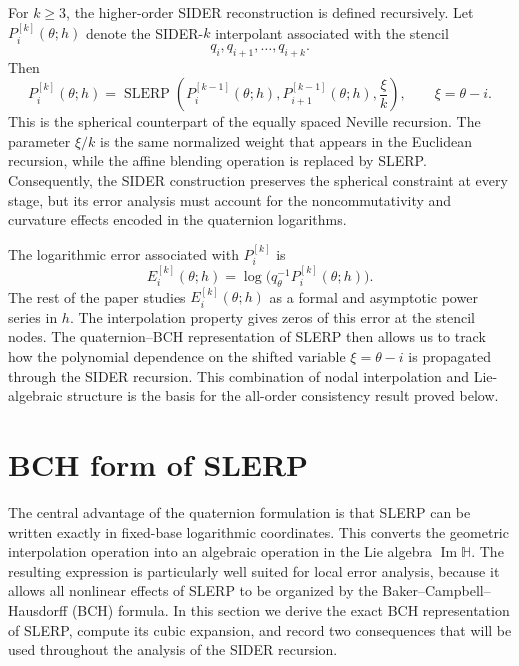 \documentclass[a4paper,11pt]{article}
\newcommand{\bH}{\mathbb{H}}
\newcommand{\SLERP}{\operatorname{SLERP}}
\newcommand{\ImH}{\operatorname{Im}\bH}
\numberwithin{equation}{section}
\theoremstyle{plain}
\theoremstyle{definition}
\theoremstyle{remark}
\begin{document}
For \(k\geq3\), the higher-order SIDER reconstruction is defined recursively.
Let \(P_i^{[k]}(\theta;h)\) denote the SIDER-\(k\) interpolant associated with
the stencil
\[
        q_i,q_{i+1},\ldots,q_{i+k}.
\]
Then
\begin{equation}
\label{eq:q_sider_rec}
        P_i^{[k]}(\theta;h)
        =
        \SLERP\!\left(
        P_i^{[k-1]}(\theta;h),
        P_{i+1}^{[k-1]}(\theta;h),
        \frac{\xi}{k}
        \right),
        \qquad \xi=\theta-i .
\end{equation}
This is the spherical counterpart of the equally spaced Neville recursion.
The parameter \(\xi/k\) is the same normalized weight that appears in the
Euclidean recursion, while the affine blending operation is replaced by
SLERP.  Consequently, the SIDER construction preserves the spherical
constraint at every stage, but its error analysis must account for the
noncommutativity and curvature effects encoded in the quaternion logarithms.

The logarithmic error associated with \(P_i^{[k]}\) is
\[
        E_i^{[k]}(\theta;h)
        =
        \log\bigl(q_\theta^{-1}P_i^{[k]}(\theta;h)\bigr).
\]
The rest of the paper studies \(E_i^{[k]}(\theta;h)\) as a formal and
asymptotic power series in \(h\).  The interpolation property gives zeros of
this error at the stencil nodes.  The quaternion--BCH representation of SLERP
then allows us to track how the polynomial dependence on the shifted variable
\(\xi=\theta-i\) is propagated through the SIDER recursion.  This combination
of nodal interpolation and Lie-algebraic structure is the basis for the
all-order consistency result proved below.

\section{BCH form of SLERP}

The central advantage of the quaternion formulation is that SLERP can be
written exactly in fixed-base logarithmic coordinates.  This converts the
geometric interpolation operation into an algebraic operation in the Lie
algebra \(\ImH\).  The resulting expression is particularly well suited for
local error analysis, because it allows all nonlinear effects of SLERP to be
organized by the Baker--Campbell--Hausdorff (BCH) formula.  In this section we
derive the exact BCH representation of SLERP, compute its cubic expansion, and
record two consequences that will be used throughout the analysis of the SIDER
recursion.
\end{document}
